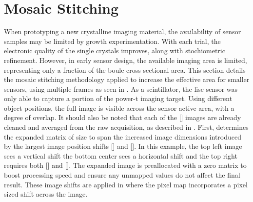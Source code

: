 \documentclass[../../main.tex]{subfiles}%
\begin{document}
%
    \section{Mosaic Stitching}%
    \label{app:image-processing:mosaic-stitching}%
    When prototyping a new crystalline imaging material, the availability of sensor samples may be limited by growth experimentation.
    With each trial, the electronic quality of the single crystals improves, along with stochiometric refinement.
    However, in early sensor design, the available imaging area is limited, representing only a fraction of the boule cross-sectional area.
    This section details the mosaic stitching methodology applied to increase the effective area for smaller sensors, using multiple frames as seen in .
    As a scintillator, the \gls{lise} sensor was only able to capture a portion of the \gls{power-t} imaging target.
    Using  different object positions, the full image is visible across the sensor active area, with a degree of overlap.
    It should also be noted that each of the [] images are already cleaned and averaged from the raw acquisition, as described in .
    First,  determines the expanded matrix of size  to span the increased image dimensions introduced by the largest image position shifts [] and [].
    In this example, the top left image sees a vertical shift  the bottom center sees a horizontal shift  and the top right requires both [] and [].
    The expanded image  is preallocated with a zero matrix to boost processing speed and ensure any unmapped values do not affect the final result. 
    These image shifts are applied in  where the pixel map incorporates a pixel sized shift across the image.
\end{document}
